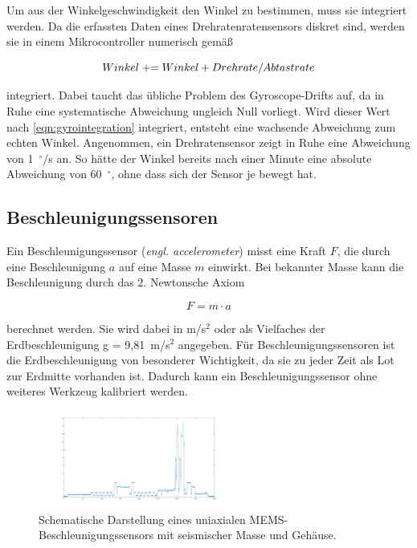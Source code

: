  	Um aus der Winkelgeschwindigkeit den Winkel zu bestimmen, muss sie integriert werden. Da die erfassten Daten eines Drehratenratensensors diskret sind, werden sie in einem Mikrocontroller numerisch gemäß
 	
	\begin{equation}
	 	Winkel \mathrel{+}= Winkel + Drehrate/Abtastrate
	 	\label{eqn:gyrointegration}
 	\end{equation}
 	
 	integriert. Dabei taucht das übliche Problem des Gyroscope-Drifts auf, da in Ruhe eine systematische Abweichung ungleich Null vorliegt. Wird dieser Wert nach \ref{eqn:gyrointegration} integriert, entsteht eine wachsende Abweichung zum echten Winkel. Angenommen, ein Drehratensensor zeigt in Ruhe eine Abweichung von 1~$^\circ$/s an. So hätte der Winkel bereits nach einer Minute eine absolute Abweichung von 60~$^\circ$, ohne dass sich der Sensor je bewegt hat.
 
	\subsection{Beschleunigungssensoren}
	Ein Beschleunigungssensor (\textit{engl. accelerometer}) misst eine Kraft $F$, die durch eine Beschleunigung $a$ auf eine Masse $m$ einwirkt. Bei bekannter Masse kann die Beschleunigung durch das 2. Newtonsche Axiom
	
	\begin{equation}
		F = m \cdot a
		\label{eqn:newton}
	\end{equation}
	
	berechnet werden. Sie wird dabei in m/s$^2$ oder als Vielfaches der Erdbeschleunigung g = 9,81~m/s$^2$ angegeben. Für Beschleunigungssensoren ist die Erdbeschleunigung von besonderer Wichtigkeit, da sie zu jeder Zeit als Lot zur Erdmitte vorhanden ist. Dadurch kann ein Beschleunigungssensor ohne weiteres Werkzeug kalibriert werden\cite{sensortechnik}.
	
 	\begin{figure}[h]
		\centering
		\includegraphics[width=0.57\textwidth]{images/accelerometer2.pdf}
		\caption[Schematische Darstellung eines Beschleunigungssensors]{Schematische Darstellung eines uniaxialen MEMS-Beschleunigungssensors mit seismischer Masse und Gehäuse.}
		\label{img:accelerometer}
	\end{figure}

